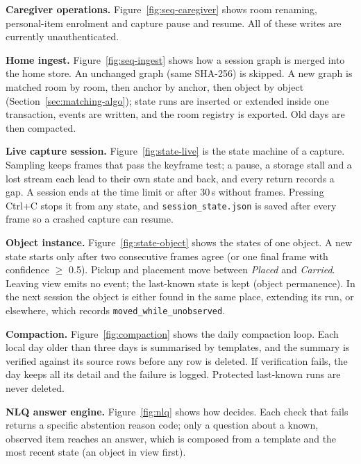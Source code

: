 
\textbf{Caregiver operations.} Figure~\ref{fig:seq-caregiver} shows room
renaming, personal-item enrolment and capture pause and resume. All of these
writes are currently unauthenticated.


\textbf{Home ingest.} Figure~\ref{fig:seq-ingest} shows how a session graph is
merged into the home store. An unchanged graph (same SHA-256) is skipped. A new
graph is matched room by room, then anchor by anchor, then object by object
(Section~\ref{sec:matching-algo}); state runs are inserted or extended inside
one transaction, events are written, and the room registry is exported. Old
days are then compacted.


\textbf{Live capture session.} Figure~\ref{fig:state-live} is the state machine
of a capture. Sampling keeps frames that pass the keyframe test; a pause,
a storage stall and a lost stream each lead to their own state and back, and
every return records a gap. A session ends at the time limit or after 30\,s
without frames. Pressing Ctrl+C stops it from any state, and
\texttt{session\_state.json} is saved after every frame so a crashed capture can
resume.


\textbf{Object instance.} Figure~\ref{fig:state-object} shows the states of one
object. A new state starts only after two consecutive frames agree (or one
final frame with confidence $\geq$ 0.5). Pickup and placement move between
\emph{Placed} and \emph{Carried}. Leaving view emits no event; the last-known
state is kept (object permanence). In the next session the object is either
found in the same place, extending its run, or elsewhere, which records
\texttt{moved\_while\_unobserved}.


\textbf{Compaction.} Figure~\ref{fig:compaction} shows the daily compaction
loop. Each local day older than three days is summarised by templates, and the
summary is verified against its source rows before any row is deleted. If
verification fails, the day keeps all its detail and the failure is logged.
Protected last-known runs are never deleted.


\textbf{NLQ answer engine.} Figure~\ref{fig:nlq} shows how  decides.
Each check that fails returns a specific abstention reason code; only a
question about a known, observed item reaches an answer, which is composed from
a template and the most recent state (an object in view first).

